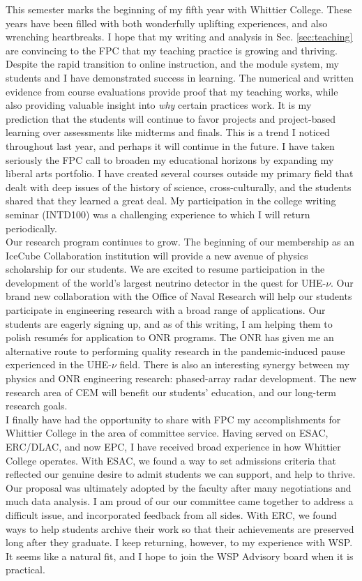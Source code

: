 \documentclass[../main.tex]{subfiles}
\begin{document}
This semester marks the beginning of my fifth year with Whittier College.  These years have been filled with both wonderfully uplifting experiences, and also wrenching heartbreaks.  I hope that my writing and analysis in Sec. \ref{sec:teaching} are convincing to the FPC that my teaching practice is growing and thriving.  Despite the rapid transition to online instruction, and the module system, my students and I have demonstrated success in learning.  The numerical and written evidence from course evaluations provide proof that my teaching works, while also providing valuable insight into \textit{why} certain practices work.  It is my prediction that the students will continue to favor projects and project-based learning over assessments like midterms and finals.  This is a trend I noticed throughout last year, and perhaps it will continue in the future.  I have taken seriously the FPC call to broaden my educational horizons by expanding my liberal arts portfolio.  I have created several courses outside my primary field that dealt with deep issues of the history of science, cross-culturally, and the students shared that they learned a great deal.  My participation in the college writing seminar (INTD100) was a challenging experience to which I will return periodically.
\\
\vspace{0.15cm}
Our research program continues to grow.  The beginning of our membership as an IceCube Collaboration institution will provide a new avenue of physics scholarship for our students.  We are excited to resume participation in the development of the world's largest neutrino detector in the quest for UHE-$\nu$.  Our brand new collaboration with the Office of Naval Research will help our students participate in engineering research with a broad range of applications.  Our students are eagerly signing up, and as of this writing, I am helping them to polish resum\'{e}s for application to ONR programs.  The ONR has given me an alternative route to performing quality research in the pandemic-induced pause experienced in the UHE-$\nu$ field.  There is also an interesting synergy between my physics and ONR engineering research: phased-array radar development.  The new research area of CEM will benefit our students' education, and our long-term research goals.
\\
\vspace{0.15cm}
I finally have had the opportunity to share with FPC my accomplishments for Whittier College in the area of committee service.  Having served on ESAC, ERC/DLAC, and now EPC, I have received broad experience in how Whittier College operates.  With ESAC, we found a way to set admissions criteria that reflected our genuine desire to admit students we can support, and help to thrive.  Our proposal was ultimately adopted by the faculty after many negotiations and much data analysis.  I am proud of our our committee came together to address a difficult issue, and incorporated feedback from all sides.  With ERC, we found ways to help students archive their work so that their achievements are preserved long after they graduate.  I keep returning, however, to my experience with WSP.  It seems like a natural fit, and I hope to join the WSP Advisory board when it is practical.
\end{document}
